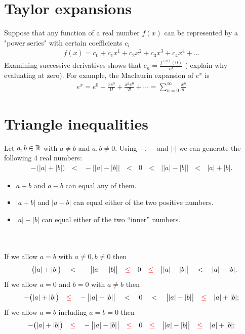\section{Taylor expansions}

Suppose that any function of a real number $f(x)$ can be represented by a "power series" with certain coefficients $c_i$
\begin{align*}
  f(x) = c_0 + c_1x^1 + c_2x^2 + c_3x^3 + c_4x^4 + ...
\end{align*}
Examining successive derivatives shows that $c_n = \frac{f^{(n)}(0)}{n!}$ ( explain why evaluating at zero).
For example, the Maclaurin expansion of $e^{x}$ is
\begin{align*}
  e^x = e^{0} + \frac{xe^0}{1!} + \frac{x^2e^0}{2!} + \cdots = \sum_{n=0}^\infty \frac{x^n}{n!}
\end{align*}

\section{Triangle inequalities}

\begin{theorem*}
  Let $a, b \in \mathbb{R}$ with $a \neq b$ and $a, b \neq 0$. Using $+$, $-$ and $|\cdot|$ we can generate the
  following 4 real numbers:
  \begin{align*}
    -\big(|a| + |b|\big) ~~~ < ~~~
    -\big||a| - |b|\big| ~~~ < ~~~
    0                    ~~~ < ~~~
    \big||a| - |b|\big|  ~~~ < ~~~
    |a| + |b|.
  \end{align*}
  \begin{itemize}
  \item $a + b$ and $a - b$ can equal any of them.
  \item $|a + b|$ and $|a - b|$ can equal either of the two positive numbers.
  \item $|a| - |b|$ can equal either of the two ``inner'' numbers.
  \end{itemize}
  ~\\~\\
  If we allow $a = b$ with $ a \neq 0, b \neq 0$ then
  \begin{align*}
    -\big(|a| + |b|\big) ~~~ < ~~~
    -\big||a| - |b|\big| ~~~ \textcolor{red}{\leq} ~~~
    0                    ~~~ \textcolor{red}{\leq} ~~~
    \big||a| - |b|\big|  ~~~ < ~~~
    |a| + |b|.
  \end{align*}
  If we allow $a = 0$ and $b = 0$ with $a \neq b$ then
  \begin{align*}
    -\big(|a| + |b|\big) ~~~ \textcolor{red}{\leq} ~~~
    -\big||a| - |b|\big| ~~~ < ~~~
    0                    ~~~ < ~~~
    \big||a| - |b|\big|  ~~~ \textcolor{red}{\leq} ~~~
    |a| + |b|;
  \end{align*}
  If we allow $a = b$ including $a = b = 0$ then
  \begin{align*}
    -\big(|a| + |b|\big) ~~~ \textcolor{red}{\leq} ~~~
    -\big||a| - |b|\big| ~~~ \textcolor{red}{\leq} ~~~
    0                    ~~~ \textcolor{red}{\leq} ~~~
    \big||a| - |b|\big|  ~~~ \textcolor{red}{\leq} ~~~
    |a| + |b|;
  \end{align*}
\end{theorem*}

